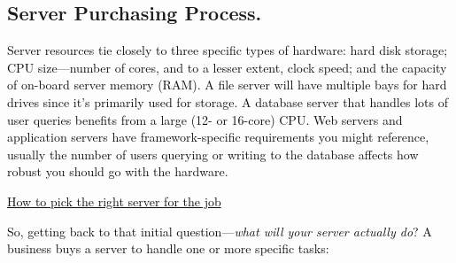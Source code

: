 \documentclass[12pt]{report}
\renewcommand{\_}{\kern-1.5pt\textunderscore\kern-1.5pt}
\begin{document}
\begin{itemize}

\par


\vspace{\baselineskip}
\vspace{\baselineskip}
\end{itemize}\subsection{Server Purchasing Process.}

\vspace{\baselineskip} \tabto{0.59in} \textcolor[HTML]{0D0D0D}{Server resources tie closely to three specific types of hardware: hard disk storage; CPU size—number of cores, and to a lesser extent, clock speed; and the capacity of on-board server memory (RAM). A file server will have multiple bays for hard drives since it’s primarily used for storage. A database server that handles lots of user queries benefits from a large (12- or 16-core) CPU. Web servers and application servers have framework-specific requirements you might reference, usually the number of users querying or writing to the database aﬀects how robust you should go with the hardware.}\par


\vspace{\baselineskip}\textcolor[HTML]{0D0D0D}{\uline{How to pick the right server for the job}}\par

{\fontsize{13pt}{15.6pt}\selectfont \textcolor[HTML]{0D0D0D}{So, getting back to that initial question—\textit{what will your server actually do}? A business buys a server to handle one or more specific tasks:}\par}\par
\end{document}

